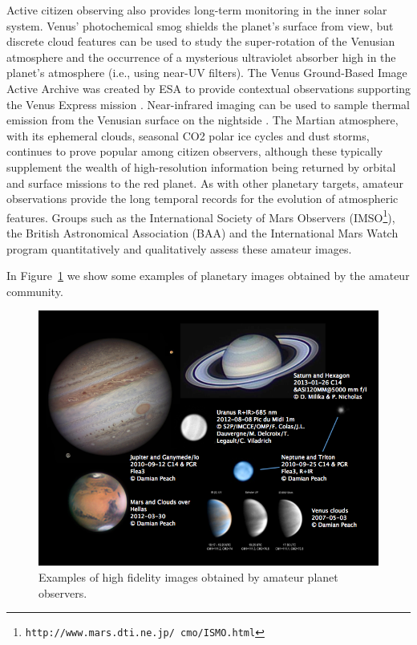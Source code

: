 \documentclass{ar2e}
\begin{document}
Active citizen observing also provides long-term monitoring in the inner solar
system.  Venus' photochemical smog shields the planet's surface from view, but
discrete cloud features can be used to study the super-rotation of the Venusian
atmosphere and the occurrence of a mysterious ultraviolet absorber high in the
planet's atmosphere (i.e., using near-UV filters).  The Venus Ground-Based Image
Active Archive was created by ESA to provide contextual observations supporting
the Venus Express mission \citep{08barentsen}.  Near-infrared imaging can be
used to sample thermal emission from the Venusian surface on the nightside
\citep{93lecacheax}.  The Martian atmosphere, with its ephemeral clouds,
seasonal CO2 polar ice cycles and dust storms, continues to prove popular among
citizen observers, although these typically supplement the wealth of
high-resolution information being returned by orbital and surface missions to
the red planet.  As with other planetary targets, amateur observations provide
the long temporal records for the evolution of atmospheric features.  Groups
such as the International Society of Mars Observers
(IMSO\footnote{\texttt{http://www.mars.dti.ne.jp/~cmo/ISMO.html}}), the British
Astronomical Association (BAA) and the International Mars Watch program
quantitatively and qualitatively assess these amateur images. 

In Figure~\ref{fig:planets} we show some examples of planetary images obtained
by the amateur community.

\begin{figure}[!ht]
\centering\includegraphics[width=\linewidth]{figs/planets.png}
\caption{Examples of high fidelity images obtained by amateur planet observers.}
\label{fig:planets}
\end{figure}
\end{document}

